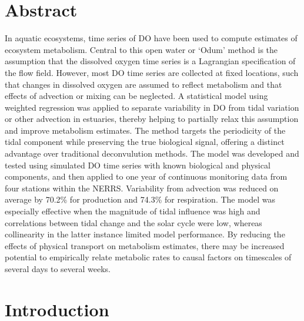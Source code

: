 \documentclass[letterpaper,12pt,oneside]{article}\usepackage[]{graphicx}\usepackage[]{color}
\begin{document}
\raggedbottom
\raggedright
{}
\setlength{\parindent}{0.5in}
\renewcommand\refname{References \vspace{12pt}}



\newpage
\section{Abstract}


In aquatic ecosystems, time series of \ac{DO} have been used to compute estimates of ecosystem metabolism.  Central to this open water or `Odum' method is the assumption that the dissolved oxygen time series is a Lagrangian specification of the flow field.  However, most \ac{DO} time series are collected at fixed locations, such that changes in dissolved oxygen are assumed to reflect metabolism and that effects of advection or mixing can be neglected.  A statistical model using weighted regression was applied to separate variability in \ac{DO} from tidal variation or other advection in estuaries, thereby helping to partially relax this assumption and improve metabolism estimates. The method targets the periodicity of the tidal component while preserving the true biological signal, offering a distinct advantage over traditional deconvulution methods.  The model was developed and tested using simulated \ac{DO} time series with known biological and physical components, and then applied to one year of continuous monitoring data from four stations within the \acl*{NERRS}.  Variability from advection was reduced on average by 70.2\% for production and 74.3\% for respiration.  The model was especially effective when the magnitude of tidal influence was high and correlations between tidal change and the solar cycle were low, whereas collinearity in the latter instance limited model performance. By reducing the effects of physical transport on metabolism estimates, there may be increased potential to empirically relate metabolic rates to causal factors on timescales of several days to several weeks.

\acresetall
\clearpage

\section{Introduction} \label{intro}
\end{document}
